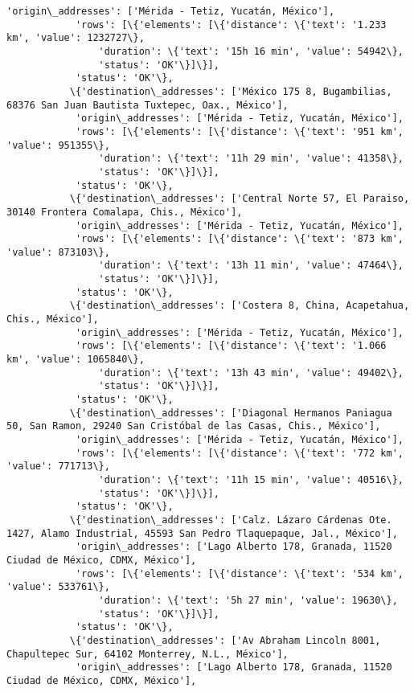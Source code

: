 \documentclass[11pt]{article}
\begin{document}
\begin{Verbatim}[commandchars=\\\{\}]
            'origin\_addresses': ['Mérida - Tetiz, Yucatán, México'],
            'rows': [\{'elements': [\{'distance': \{'text': '1.233 km', 'value': 1232727\},
                'duration': \{'text': '15h 16 min', 'value': 54942\},
                'status': 'OK'\}]\}],
            'status': 'OK'\},
           \{'destination\_addresses': ['México 175 8, Bugambilias, 68376 San Juan Bautista Tuxtepec, Oax., México'],
            'origin\_addresses': ['Mérida - Tetiz, Yucatán, México'],
            'rows': [\{'elements': [\{'distance': \{'text': '951 km', 'value': 951355\},
                'duration': \{'text': '11h 29 min', 'value': 41358\},
                'status': 'OK'\}]\}],
            'status': 'OK'\},
           \{'destination\_addresses': ['Central Norte 57, El Paraiso, 30140 Frontera Comalapa, Chis., México'],
            'origin\_addresses': ['Mérida - Tetiz, Yucatán, México'],
            'rows': [\{'elements': [\{'distance': \{'text': '873 km', 'value': 873103\},
                'duration': \{'text': '13h 11 min', 'value': 47464\},
                'status': 'OK'\}]\}],
            'status': 'OK'\},
           \{'destination\_addresses': ['Costera 8, China, Acapetahua, Chis., México'],
            'origin\_addresses': ['Mérida - Tetiz, Yucatán, México'],
            'rows': [\{'elements': [\{'distance': \{'text': '1.066 km', 'value': 1065840\},
                'duration': \{'text': '13h 43 min', 'value': 49402\},
                'status': 'OK'\}]\}],
            'status': 'OK'\},
           \{'destination\_addresses': ['Diagonal Hermanos Paniagua 50, San Ramon, 29240 San Cristóbal de las Casas, Chis., México'],
            'origin\_addresses': ['Mérida - Tetiz, Yucatán, México'],
            'rows': [\{'elements': [\{'distance': \{'text': '772 km', 'value': 771713\},
                'duration': \{'text': '11h 15 min', 'value': 40516\},
                'status': 'OK'\}]\}],
            'status': 'OK'\},
           \{'destination\_addresses': ['Calz. Lázaro Cárdenas Ote. 1427, Alamo Industrial, 45593 San Pedro Tlaquepaque, Jal., México'],
            'origin\_addresses': ['Lago Alberto 178, Granada, 11520 Ciudad de México, CDMX, México'],
            'rows': [\{'elements': [\{'distance': \{'text': '534 km', 'value': 533761\},
                'duration': \{'text': '5h 27 min', 'value': 19630\},
                'status': 'OK'\}]\}],
            'status': 'OK'\},
           \{'destination\_addresses': ['Av Abraham Lincoln 8001, Chapultepec Sur, 64102 Monterrey, N.L., México'],
            'origin\_addresses': ['Lago Alberto 178, Granada, 11520 Ciudad de México, CDMX, México'],

\end{Verbatim}
\end{document}
